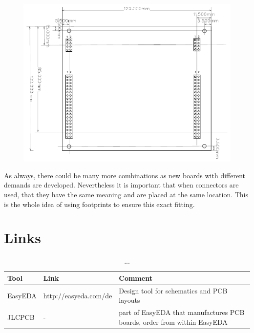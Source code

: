 \begin{figure}[ht]
    \centering
    \includegraphics[page=1, width=\textwidth]{./figures/LCS-FP-EXT-L-R-40-10X12.pdf}
\end{figure}

\FloatBarrier

As always, there could be many more combinations as new boards with different demands are developed. Nevertheless it is important that when connectors are used, that they have the same meaning and are placed at the same location. This is the whole idea of using footprints to ensure this exact fitting.

\section{Links}

\begin{table}[!ht]
    \begin{center}
        \caption{...}
        \begin{tabular}{|l|l|p{}|}
            \toprule
            \textbf{Tool} & \textbf{Link} & \textbf{Comment} \\
            \midrule
            EasyEDA & http://easyeda.com/de & Design tool for schematics and PCB layouts \\
            \midrule
            JLCPCB & - & part of EasyEDA that manufactures PCB boards, order from within EasyEDA \\
            \bottomrule
        \end{tabular}
    \end{center}
\end{table}
